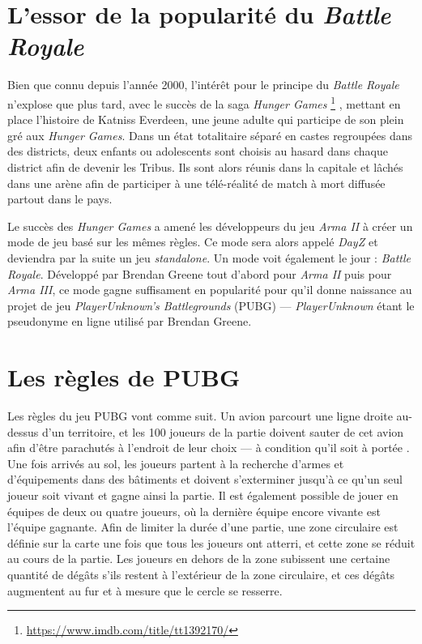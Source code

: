 \section{L'essor de la popularité du \emph{Battle Royale}}
Bien que connu depuis l'ann\'ee 2000, l'intérêt pour le principe du \emph{Battle Royale} n'explose que plus tard, avec le succès de la saga \emph{Hunger Games}%
%
\footnote{\url{https://www.imdb.com/title/tt1392170/}}
%
, mettant en place l'histoire de Katniss Everdeen, une jeune adulte qui participe de son plein gré aux \emph{Hunger Games}. Dans un état totalitaire séparé en castes regroupées dans des districts, deux enfants ou adolescents sont choisis au hasard dans chaque district afin de devenir les Tribus. Ils sont alors réunis dans la capitale et lâchés dans une arène afin de participer à une télé-réalité de match à mort diffusée partout dans le pays.

Le succès des \emph{Hunger Games} a amené les développeurs du jeu \emph{Arma II} à créer un mode de jeu basé sur les mêmes règles. Ce mode sera alors appelé \emph{DayZ} et deviendra par la suite un jeu \emph{standalone}. Un mode voit également le jour : \emph{Battle Royale}. Développé par Brendan Greene tout d'abord pour \emph{Arma II} puis pour \emph{Arma III}, ce mode gagne suffisament en popularité pour qu'il donne naissance au projet de jeu \emph{PlayerUnknown's Battlegrounds} (PUBG) --- \emph{PlayerUnknown} étant le pseudonyme en ligne utilisé par Brendan Greene.

\section{Les règles de PUBG}
Les r\`egles du jeu PUBG vont comme suit.
Un avion parcourt une ligne droite au-dessus d'un territoire, et les 100 joueurs de la partie doivent sauter de cet avion afin d'être parachutés à l'endroit de leur choix --- à condition qu'il soit à portée . Une fois arrivés au sol, les joueurs partent à la recherche d'armes et d'équipements dans des bâtiments et doivent s'exterminer jusqu'à ce qu'un seul joueur soit vivant et gagne ainsi la partie. Il est également possible de jouer en \'equipes de deux ou quatre joueurs, o\`u la dernière équipe encore vivante est l'\'equipe gagnante. Afin de limiter la durée d'une partie, une zone circulaire est définie sur la carte une fois que tous les joueurs ont atterri, et cette zone se réduit au cours de la partie. Les joueurs en dehors de la zone subissent une certaine quantité de dégâts s'ils restent \`a l'ext\'erieur de la zone circulaire, et ces dégâts augmentent au fur et à mesure que le cercle se resserre.

